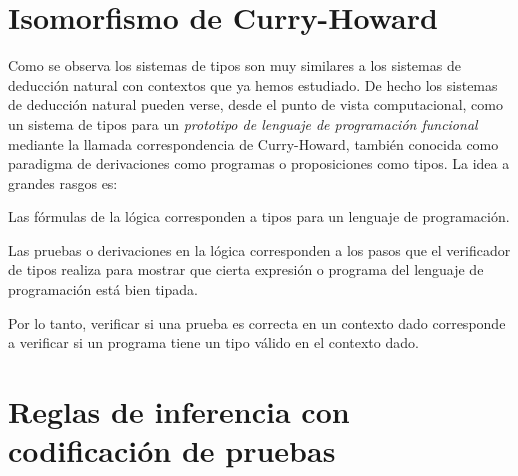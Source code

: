 \documentclass[11pt,letterpaper]{article}
\begin{document}



\section{Isomorfismo de Curry-Howard}

Como se observa los sistemas de tipos son muy similares a los sistemas
de deducción natural con contextos que ya hemos estudiado. De hecho
los sistemas de deducción natural pueden verse, desde el punto de
vista computacional, como un sistema de tipos para un \textit{prototipo de 
lenguaje de programación funcional} mediante la llamada correspondencia de 
Curry-Howard, también conocida como paradigma de derivaciones como programas o 
proposiciones como tipos. La idea a grandes rasgos es:
\bi
 \item Las fórmulas de la lógica corresponden a tipos para un lenguaje
  de programación.
 \item Las pruebas o derivaciones en la lógica corresponden a los
  pasos que el verificador de tipos realiza para mostrar que cierta
  expresión o programa del lenguaje de programación está bien tipada.
 \item Por lo tanto, verificar si una prueba es correcta en un contexto dado 
  corresponde a verificar si un programa tiene un tipo válido en el contexto 
  dado.
\ei

\section{Reglas de inferencia con codificación de pruebas}
\end{document}
